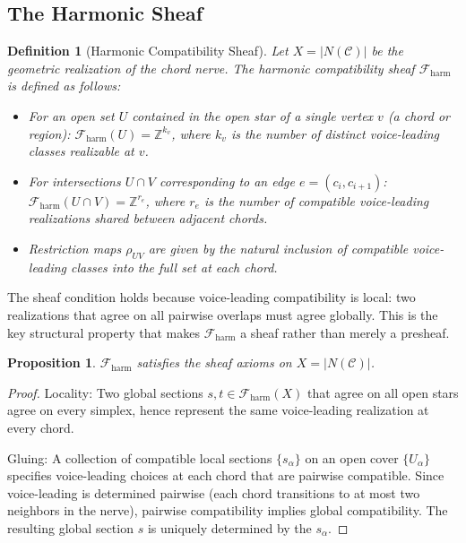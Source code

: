 \documentclass[12pt,a4paper]{article}
\newtheorem{proposition}[theorem]{Proposition}
\newtheorem{definition}[theorem]{Definition}
\newcommand{\ZZ}{\mathbb{Z}}
\newcommand{\sheaf}{\mathscr{F}}
\begin{document}
\subsection{The Harmonic Sheaf}

\begin{definition}[Harmonic Compatibility Sheaf]\label{def:harmonic-sheaf}
  Let $X = |N(\mathcal{C})|$ be the geometric realization of the chord nerve. The 
  \emph{harmonic compatibility sheaf} $\sheaf_{\mathrm{harm}}$ is defined as follows:
  \begin{itemize}
    \item For an open set $U$ contained in the open star of a single vertex $v$ (a chord or region):
      $\sheaf_{\mathrm{harm}}(U) = \ZZ^{k_v}$, where $k_v$ is the number of distinct 
      voice-leading classes realizable at $v$.
    \item For intersections $U \cap V$ corresponding to an edge $e = (c_i, c_{i+1})$:
      $\sheaf_{\mathrm{harm}}(U \cap V) = \ZZ^{r_e}$, where $r_e$ is the number of 
      compatible voice-leading realizations shared between adjacent chords.
    \item Restriction maps $\rho_{UV}$ are given by the natural inclusion of compatible 
      voice-leading classes into the full set at each chord.
  \end{itemize}
\end{definition}

The sheaf condition holds because voice-leading compatibility is local: two realizations 
that agree on all pairwise overlaps must agree globally. This is the key structural property 
that makes $\sheaf_{\mathrm{harm}}$ a sheaf rather than merely a presheaf.

\begin{proposition}\label{prop:sheaf-well-defined}
  $\sheaf_{\mathrm{harm}}$ satisfies the sheaf axioms on $X = |N(\mathcal{C})|$.
\end{proposition}

\begin{proof}
  Locality: Two global sections $s, t \in \sheaf_{\mathrm{harm}}(X)$ that agree on all 
  open stars agree on every simplex, hence represent the same voice-leading realization 
  at every chord.

  Gluing: A collection of compatible local sections $\{s_\alpha\}$ on an open cover 
  $\{U_\alpha\}$ specifies voice-leading choices at each chord that are pairwise compatible. 
  Since voice-leading is determined pairwise (each chord transitions to at most two neighbors 
  in the nerve), pairwise compatibility implies global compatibility. The resulting global 
  section $s$ is uniquely determined by the $s_\alpha$.
\end{proof}
\end{document}
